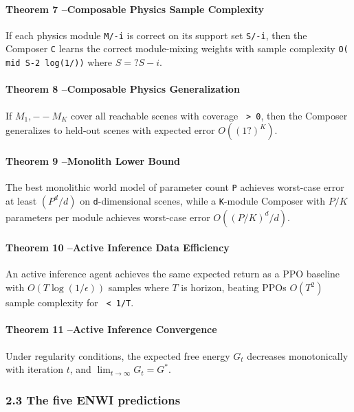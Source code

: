 \documentclass[11pt]{article}
\begin{document}
\paragraph{Theorem 7 --Composable Physics Sample Complexity}

If each physics module \texttt{M/-i} is correct on its support set \texttt{S/-i}, then the
Composer \texttt{C} learns the correct module-mixing weights with sample complexity
\texttt{O(\\mid S\textbar{}-2 log(1/))} where $S = ?S-i$.

\paragraph{Theorem 8 --Composable Physics Generalization}

If $M_1, -- M_K$ cover all reachable scenes with coverage \texttt{ > 0}, then the
Composer generalizes to held-out scenes with expected error $O((1 ?)^{K})$.

\paragraph{Theorem 9 --Monolith Lower Bound}

The best monolithic world model of parameter count \texttt{P} achieves worst-case error
at least $(P^{d}/d)$ on \texttt{d}-dimensional scenes, while a \texttt{K}-module Composer
with $P/K$ parameters per module achieves worst-case error $O((P/K)^{d}/d)$.

\paragraph{Theorem 10 --Active Inference Data Efficiency}

An active inference agent achieves the same expected return as a PPO baseline
with $O(T\log(1/\epsilon))$ samples where $T$ is horizon, beating PPOs $O(T^2)$
sample complexity for \texttt{ < 1/T}.

\paragraph{Theorem 11 --Active Inference Convergence}

Under regularity conditions, the expected free energy $G_t$ decreases
monotonically with iteration $t$, and $\lim_{t\to\infty}G_t=G^*$.

\subsubsection{2.3 The five ENWI predictions}
\end{document}
